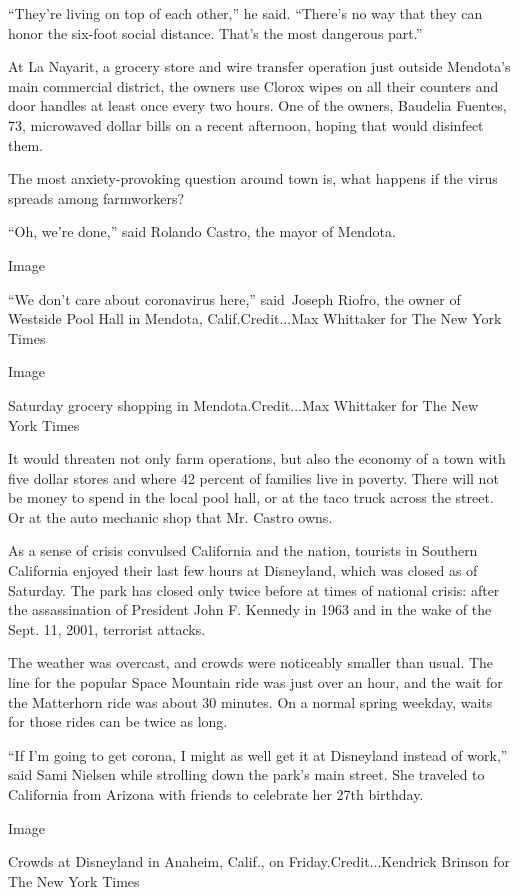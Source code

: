 ``They're living on top of each other,'' he said. ``There's no way that
they can honor the six-foot social distance. That's the most dangerous
part.''

At La Nayarit, a grocery store and wire transfer operation just outside
Mendota's main commercial district, the owners use Clorox wipes on all
their counters and door handles at least once every two hours. One of
the owners, Baudelia Fuentes, 73, microwaved dollar bills on a recent
afternoon, hoping that would disinfect them.

The most anxiety-provoking question around town is, what happens if the
virus spreads among farmworkers?

``Oh, we're done,'' said Rolando Castro, the mayor of Mendota.

Image

``We don't care about coronavirus here,'' said~Joseph Riofro, the owner
of Westside Pool Hall in Mendota, Calif.Credit...Max Whittaker for The
New York Times

Image

Saturday grocery shopping in Mendota.Credit...Max Whittaker for The New
York Times

It would threaten not only farm operations, but also the economy of a
town with five dollar stores and where 42 percent of families live in
poverty. There will not be money to spend in the local pool hall, or at
the taco truck across the street. Or at the auto mechanic shop that Mr.
Castro owns.

As a sense of crisis convulsed California and the nation, tourists in
Southern California enjoyed their last few hours at Disneyland, which
was closed as of Saturday. The park has closed only twice before at
times of national crisis: after the assassination of President John F.
Kennedy in 1963 and in the wake of the Sept. 11, 2001, terrorist
attacks.

The weather was overcast, and crowds were noticeably smaller than usual.
The line for the popular Space Mountain ride was just over an hour, and
the wait for the Matterhorn ride was about 30 minutes. On a normal
spring weekday, waits for those rides can be twice as long.

``If I'm going to get corona, I might as well get it at Disneyland
instead of work,'' said Sami Nielsen while strolling down the park's
main street. She traveled to California from Arizona with friends to
celebrate her 27th birthday.

Image

Crowds at Disneyland in Anaheim, Calif., on Friday.Credit...Kendrick
Brinson for The New York Times

